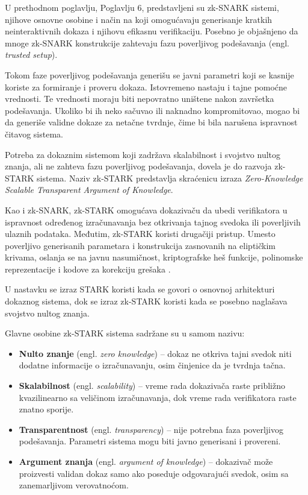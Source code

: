 U prethodnom poglavlju, Poglavlju 6, predstavljeni su zk-SNARK sistemi, njihove
osnovne osobine i način na koji omogućavaju generisanje kratkih neinteraktivnih
dokaza i njihovu efikasnu verifikaciju. Posebno je objašnjeno da mnoge zk-SNARK
konstrukcije zahtevaju fazu poverljivog podešavanja
(engl. \textit{trusted setup}).

Tokom faze poverljivog podešavanja generišu se javni parametri koji se kasnije
koriste za formiranje i proveru dokaza. Istovremeno nastaju i tajne pomoćne
vrednosti. Te vrednosti moraju biti nepovratno uništene nakon završetka
podešavanja. Ukoliko bi ih neko sačuvao ili naknadno kompromitovao, mogao bi
da generiše validne dokaze za netačne tvrdnje, čime bi bila narušena ispravnost
čitavog sistema.

Potreba za dokaznim sistemom koji zadržava skalabilnost i svojstvo nultog znanja,
ali ne zahteva fazu poverljivog podešavanja, dovela je do razvoja zk-STARK
sistema. Naziv zk-STARK predstavlja skraćenicu izraza
\textit{Zero-Knowledge Scalable Transparent Argument of Knowledge}.

Kao i zk-SNARK, zk-STARK omogućava dokazivaču da ubedi verifikatora u
ispravnost određenog izračunavanja bez otkrivanja tajnog svedoka ili poverljivih
ulaznih podataka. Međutim, zk-STARK koristi drugačiji pristup. Umesto
poverljivo generisanih parametara i konstrukcija zasnovanih na eliptičkim
krivama, oslanja se na javnu nasumičnost, kriptografske heš funkcije,
polinomske reprezentacije i kodove za korekciju grešaka \cite{stark2018}.

U nastavku se izraz STARK koristi kada se govori o osnovnoj arhitekturi
dokaznog sistema, dok se izraz zk-STARK koristi kada se posebno naglašava
svojstvo nultog znanja.

Glavne osobine zk-STARK sistema sadržane su u samom nazivu:

\begin{itemize}
    \item \textbf{Nulto znanje} (engl. \textit{zero knowledge}) -- dokaz
    ne otkriva tajni svedok niti dodatne informacije o izračunavanju, osim
    činjenice da je tvrdnja tačna.

    \item \textbf{Skalabilnost} (engl. \textit{scalability}) -- vreme rada
    dokazivača raste približno kvazilinearno sa veličinom izračunavanja, dok
    vreme rada verifikatora raste znatno sporije.

    \item \textbf{Transparentnost} (engl. \textit{transparency}) -- nije
    potrebna faza poverljivog podešavanja. Parametri sistema mogu biti javno
    generisani i provereni.

    \item \textbf{Argument znanja} (engl. \textit{argument of knowledge}) --
    dokazivač može proizvesti validan dokaz samo ako poseduje odgovarajući
    svedok, osim sa zanemarljivom verovatnoćom.
\end{itemize}

